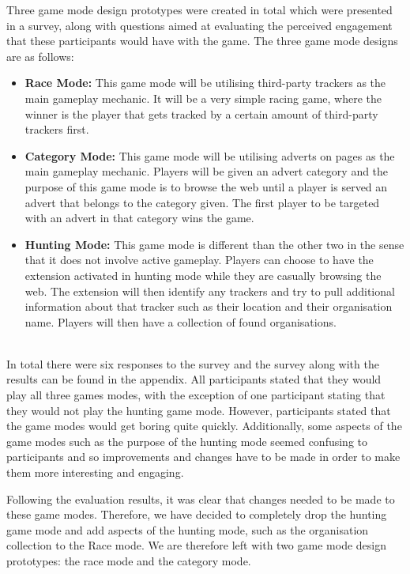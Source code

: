 \documentclass{l4proj}
\begin{document}
Three game mode design prototypes were created in total which were presented in a survey, along with questions aimed at evaluating the perceived engagement that these participants would have with the game. The three game mode designs are as follows:
\\
\begin{itemize}
   \item
   \textbf{Race Mode:} This game mode will be utilising third-party trackers as the main gameplay mechanic. It will be a very simple racing game, where the winner is the player that gets tracked by a certain amount of third-party trackers first.

   \item
   \textbf{Category Mode:} This game mode will be utilising adverts on pages as the main gameplay mechanic. Players will be given an advert category and the purpose of this game mode is to browse the web until a player is served an advert that belongs to the category given. The first player to be targeted with an advert in that category wins the game.

   \item
   \textbf{Hunting Mode:} This game mode is different than the other two in the sense that it does not involve active gameplay. Players can choose to have the extension activated in hunting mode while they are casually browsing the web. The extension will then identify any trackers and try to pull additional information about that tracker such as their location and their organisation name. Players will then have a collection of found organisations.
\end{itemize} 
\\
In total there were six responses to the survey and the survey along with the results can be found in the appendix. All participants stated that they would play all three games modes, with the exception of one participant stating that they would not play the hunting game mode. However, participants stated that the game modes would get boring quite quickly. Additionally, some aspects of the game modes such as the purpose of the hunting mode seemed confusing to participants and so improvements and changes have to be made in order to make them more interesting and engaging.

Following the evaluation results, it was clear that changes needed to be made to these game modes. Therefore, we have decided to completely drop the hunting game mode and add aspects of the hunting mode, such as the organisation collection to the Race mode. We are therefore left with two game mode design prototypes: the race mode and the category mode.
\end{document}

